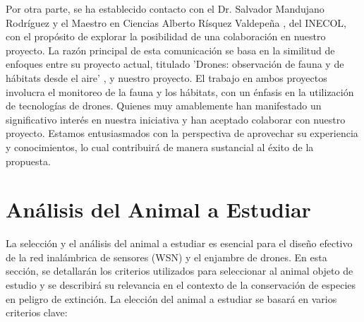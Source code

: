 Por otra parte, se ha establecido contacto con el Dr. Salvador Mandujano Rodríguez \cite{111} y el Maestro en Ciencias Alberto Rísquez Valdepeña \cite{112}, del INECOL, con el propósito de explorar la posibilidad de una colaboración en nuestro proyecto. La razón principal de esta comunicación se basa en la similitud de enfoques entre su proyecto actual, titulado 'Drones: observación de fauna y de hábitats desde el aire' \cite{113}, y nuestro proyecto. El trabajo en ambos proyectos involucra el monitoreo de la fauna y los hábitats, con un énfasis en la utilización de tecnologías de drones. Quienes muy amablemente han manifestado un significativo interés en nuestra iniciativa y han aceptado colaborar con nuestro proyecto. Estamos entusiasmados con la perspectiva de aprovechar su experiencia y conocimientos, lo cual contribuirá de manera sustancial al éxito de la propuesta.

\newpage
\section{Análisis del Animal a Estudiar}
La selección y el análisis del animal a estudiar es esencial para el diseño efectivo de la red inalámbrica de sensores (WSN) y el enjambre de drones. En esta sección, se detallarán los criterios utilizados para seleccionar al animal objeto de estudio y se describirá su relevancia en el contexto de la conservación de especies en peligro de extinción. La elección del animal a estudiar se basará en varios criterios clave:

